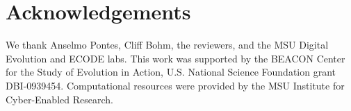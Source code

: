 \vspace*{-2mm}
\section{Acknowledgements}

We thank Anselmo Pontes, Cliff Bohm, the reviewers, and the MSU Digital Evolution  and ECODE labs. %
This work was supported by the BEACON Center for the Study of Evolution in Action, U.S. National Science Foundation grant DBI-0939454.
Computational resources were provided by the MSU Institute for Cyber-Enabled Research.
